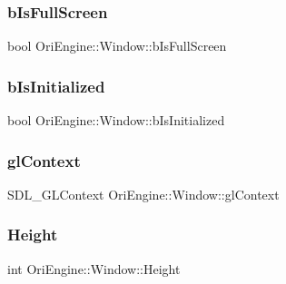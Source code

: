 \subsubsection{\texorpdfstring{b\+Is\+Full\+Screen}{bIsFullScreen}}
{\footnotesize\ttfamily bool Ori\+Engine\+::\+Window\+::b\+Is\+Full\+Screen\hspace{0.3cm}{\ttfamily [private]}}

\hypertarget{class_ori_engine_1_1_window_a9a2f58afdd7d2cdd920f7c733b4b7dd6}{}\label{class_ori_engine_1_1_window_a9a2f58afdd7d2cdd920f7c733b4b7dd6} 
\subsubsection{\texorpdfstring{b\+Is\+Initialized}{bIsInitialized}}
{\footnotesize\ttfamily bool Ori\+Engine\+::\+Window\+::b\+Is\+Initialized\hspace{0.3cm}{\ttfamily [private]}}

\hypertarget{class_ori_engine_1_1_window_a1e0582658a858b0cfa732c990a8573c0}{}\label{class_ori_engine_1_1_window_a1e0582658a858b0cfa732c990a8573c0} 
\subsubsection{\texorpdfstring{gl\+Context}{glContext}}
{\footnotesize\ttfamily S\+D\+L\+\_\+\+G\+L\+Context Ori\+Engine\+::\+Window\+::gl\+Context\hspace{0.3cm}{\ttfamily [private]}}

\hypertarget{class_ori_engine_1_1_window_a2315cbe759b91f12618a81f47b1f4c32}{}\label{class_ori_engine_1_1_window_a2315cbe759b91f12618a81f47b1f4c32} 
\subsubsection{\texorpdfstring{Height}{Height}}
{\footnotesize\ttfamily int Ori\+Engine\+::\+Window\+::\+Height\hspace{0.3cm}{\ttfamily [private]}}

